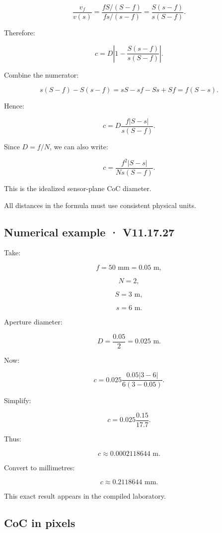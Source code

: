 \[ \frac{v_f}{v(s)} = \frac{fS/(S-f)}{fs/(s-f)} = \frac{S(s-f)}{s(S-f)}. \]

Therefore:

\[ c=D \left| 1-\frac{S(s-f)}{s(S-f)} \right|. \]

Combine the numerator:

\[ s(S-f)-S(s-f) = sS-sf-Ss+Sf =f(S-s). \]

Hence:

\[ \boxed{ c= D\frac{f|S-s|}{s(S-f)}. } \]

Since \(D=f/N\), we can also write:

\[ \boxed{ c= \frac{f^2|S-s|} {Ns(S-f)}. } \]

This is the idealized sensor-plane CoC diameter.

All distances in the formula must use consistent physical units.

\subsection{Numerical example · V11.17.27}\label{02-foundations-ii-ch036-numerical-example-v11.17.27}

\hypertarget{02-foundations-ii-ch036-numerical-example-v11.17.27}{}

Take:

\[ f=50\text{ mm}=0.05\text{ m}, \]

\[ N=2, \]

\[ S=3\text{ m}, \]

\[ s=6\text{ m}. \]

Aperture diameter:

\[ D=\frac{0.05}{2}=0.025\text{ m}. \]

Now:

\[ c= 0.025 \frac{ 0.05|3-6| }{ 6(3-0.05) }. \]

Simplify:

\[ c= 0.025 \frac{0.15}{17.7}. \]

Thus:

\[ c\approx0.0002118644\text{ m}. \]

Convert to millimetres:

\[ \boxed{ c\approx0.2118644\text{ mm}. } \]

This exact result appears in the compiled laboratory.

\subsection{CoC in pixels}\label{02-foundations-ii-ch036-coc-in-pixels}

